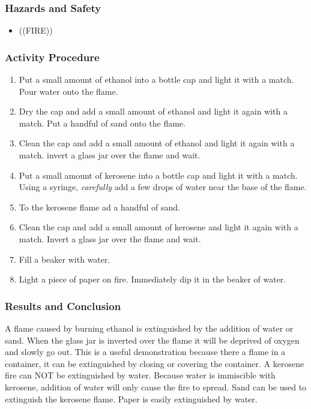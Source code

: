 \subsubsection*{Hazards and Safety}
\begin{itemize}
\item{((FIRE))}
\end{itemize}

\subsubsection*{Activity Procedure}
\begin{enumerate}
\item{Put a small amount of ethanol into a bottle cap and light it with a match. Pour water onto the flame.}
\item{Dry the cap and add a small amount of ethanol and light it again with a match. Put a handful of sand onto the flame.}
\item{Clean the cap and add a small amount of ethanol and light it again with a match. invert a glass jar over the flame and wait.}
\item{Put a small amount of kerosene into a bottle cap and light it with a match. Using a syringe, \textit{carefully} add a few drops of water near the base of the flame.}
\item{To the kerosene flame ad a handful of sand.}
\item{Clean the cap and add a small amount of kerosene and light it again with a match. Invert a glass jar over the flame and wait.}
\item{Fill a beaker with water.}
\item{Light a piece of paper on fire. Immediately dip it in the beaker of water.}
\end{enumerate}

\subsubsection*{Results and Conclusion}
A flame caused by burning ethanol is extinguished by the addition of water or sand. When the glass jar is inverted over the flame it will be deprived of oxygen and slowly go out. This is a useful demonstration because there a flame in a container, it can be extinguished by closing or covering the container.
A kerosene fire can NOT be extinguished by water. Because water is immiscible with kerosene, addition of water will only cause the fire to spread. Sand can be used to extinguish the kerosene flame.
Paper is easily extinguished by water.
